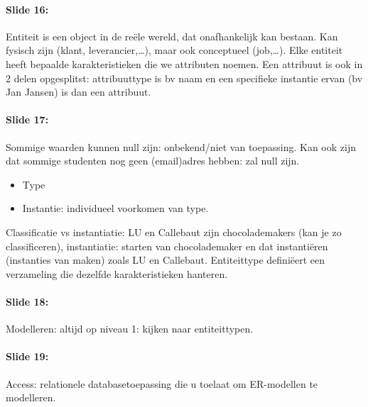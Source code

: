 \documentclass[10pt,a4paper]{report}
\begin{document}
\paragraph{Slide 16:}Entiteit is een object in de reële wereld, dat onafhankelijk kan bestaan. Kan fysisch zijn (klant, leverancier,…), maar ook conceptueel (job,…). Elke entiteit heeft bepaalde karakteristieken die we attributen noemen.
Een attribuut is ook in 2 delen opgesplitst: attribuuttype is bv naam en een specifieke instantie ervan (bv Jan Jansen) is dan een attribuut.

\paragraph{Slide 17:}Sommige waarden kunnen null zijn: onbekend/niet van toepassing. Kan ook zijn dat sommige studenten nog geen (email)adres hebben: zal null zijn.
\begin{itemize}
\item Type
\item Instantie: individueel voorkomen van type.
\end{itemize}
Classificatie vs instantiatie: LU en Callebaut zijn chocolademakers (kan je zo classificeren), instantiatie: starten van chocolademaker en dat instantiëren (instanties van maken) zoals LU en Callebaut. Entiteittype definiëert een verzameling die dezelfde karakteristieken hanteren.

\paragraph{Slide 18:}Modelleren: altijd op niveau 1: kijken naar entiteittypen.

\paragraph{Slide 19:}Access: relationele databasetoepassing die u toelaat om ER-modellen te modelleren. 
\end{document}
